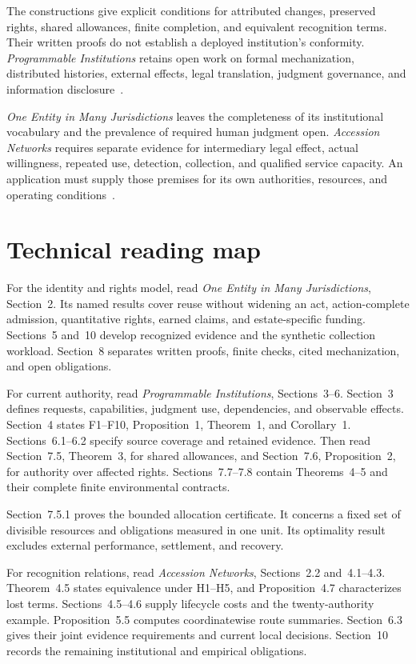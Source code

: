 \documentclass{momentum}
\begin{document}
The constructions give explicit conditions for attributed changes, preserved rights, shared allowances, finite completion, and equivalent recognition terms.
Their written proofs do not establish a deployed institution's conformity.
\emph{Programmable Institutions} retains open work on formal mechanization, distributed histories, external effects, legal translation, judgment governance, and information disclosure~\cite[Section~10]{institutions}.

\emph{One Entity in Many Jurisdictions} leaves the completeness of its institutional vocabulary and the prevalence of required human judgment open.
\emph{Accession Networks} requires separate evidence for intermediary legal effect, actual willingness, repeated use, detection, collection, and qualified service capacity.
An application must supply those premises for its own authorities, resources, and operating conditions~\cite[Section~8]{entity}\cite[Sections~7.4, 7.8, and 10]{accession}.

\section{Technical reading map}
\label{sec:reading}

For the identity and rights model, read \emph{One Entity in Many Jurisdictions}, Section~2.
Its named results cover reuse without widening an act, action-complete admission, quantitative rights, earned claims, and estate-specific funding.
Sections~5 and~10 develop recognized evidence and the synthetic collection workload.
Section~8 separates written proofs, finite checks, cited mechanization, and open obligations.

For current authority, read \emph{Programmable Institutions}, Sections~3--6.
Section~3 defines requests, capabilities, judgment use, dependencies, and observable effects.
Section~4 states F1--F10, Proposition~1, Theorem~1, and Corollary~1.
Sections~6.1--6.2 specify source coverage and retained evidence.
Then read Section~7.5, Theorem~3, for shared allowances, and Section~7.6, Proposition~2, for authority over affected rights.
Sections~7.7--7.8 contain Theorems~4--5 and their complete finite environmental contracts.

Section~7.5.1 proves the bounded allocation certificate.
It concerns a fixed set of divisible resources and obligations measured in one unit.
Its optimality result excludes external performance, settlement, and recovery.

For recognition relations, read \emph{Accession Networks}, Sections~2.2 and~4.1--4.3.
Theorem~4.5 states equivalence under H1--H5, and Proposition~4.7 characterizes lost terms.
Sections~4.5--4.6 supply lifecycle costs and the twenty-authority example.
Proposition~5.5 computes coordinatewise route summaries.
Section~6.3 gives their joint evidence requirements and current local decisions.
Section~10 records the remaining institutional and empirical obligations.
\end{document}
